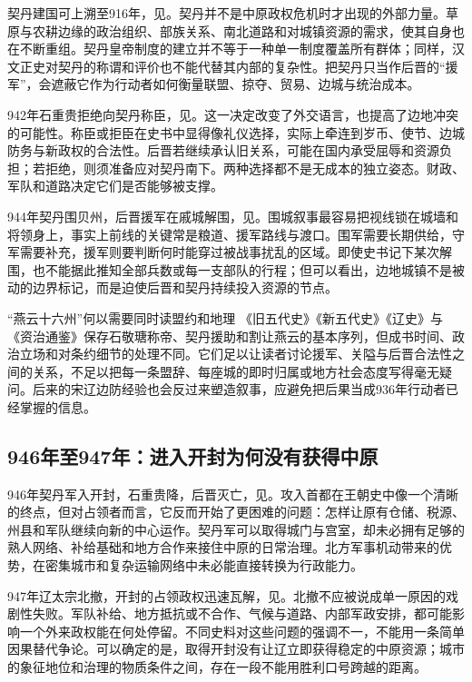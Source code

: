 契丹建国可上溯至916年，见。契丹并不是中原政权危机时才出现的外部力量。草原与农耕边缘的政治组织、部族关系、南北道路和对城镇资源的需求，使其自身也在不断重组。契丹皇帝制度的建立并不等于一种单一制度覆盖所有群体；同样，汉文正史对契丹的称谓和评价也不能代替其内部的复杂性。把契丹只当作后晋的“援军”，会遮蔽它作为行动者如何衡量联盟、掠夺、贸易、边城与统治成本。

942年石重贵拒绝向契丹称臣，见。这一决定改变了外交语言，也提高了边地冲突的可能性。称臣或拒臣在史书中显得像礼仪选择，实际上牵连到岁币、使节、边城防务与新政权的合法性。后晋若继续承认旧关系，可能在国内承受屈辱和资源负担；若拒绝，则须准备应对契丹南下。两种选择都不是无成本的独立姿态。财政、军队和道路决定它们是否能够被支撑。

944年契丹围贝州，后晋援军在戚城解围，见。围城叙事最容易把视线锁在城墙和将领身上，事实上前线的关键常是粮道、援军路线与渡口。围军需要长期供给，守军需要补充，援军则要判断何时能穿过被战事扰乱的区域。即使史书记下某次解围，也不能据此推知全部兵数或每一支部队的行程；但可以看出，边地城镇不是被动的边界标记，而是迫使后晋和契丹持续投入资源的节点。

\begin{sourcenote}{“燕云十六州”何以需要同时读盟约和地理}
《旧五代史》《新五代史》《辽史》与《资治通鉴》保存石敬瑭称帝、契丹援助和割让燕云的基本序列，但成书时间、政治立场和对条约细节的处理不同。它们足以让读者讨论援军、关隘与后晋合法性之间的关系，不足以把每一条盟辞、每座城的即时归属或地方社会态度写得毫无疑问。后来的宋辽边防经验也会反过来塑造叙事，应避免把后果当成936年行动者已经掌握的信息。
\end{sourcenote}

\subsection{946年至947年：进入开封为何没有获得中原}

946年契丹军入开封，石重贵降，后晋灭亡，见。攻入首都在王朝史中像一个清晰的终点，但对占领者而言，它反而开始了更困难的问题：怎样让原有仓储、税源、州县和军队继续向新的中心运作。契丹军可以取得城门与宫室，却未必拥有足够的熟人网络、补给基础和地方合作来接住中原的日常治理。北方军事机动带来的优势，在密集城市和复杂运输网络中未必能直接转换为行政能力。

947年辽太宗北撤，开封的占领政权迅速瓦解，见。北撤不应被说成单一原因的戏剧性失败。军队补给、地方抵抗或不合作、气候与道路、内部军政安排，都可能影响一个外来政权能在何处停留。不同史料对这些问题的强调不一，不能用一条简单因果替代争论。可以确定的是，取得开封没有让辽立即获得稳定的中原资源；城市的象征地位和治理的物质条件之间，存在一段不能用胜利口号跨越的距离。

